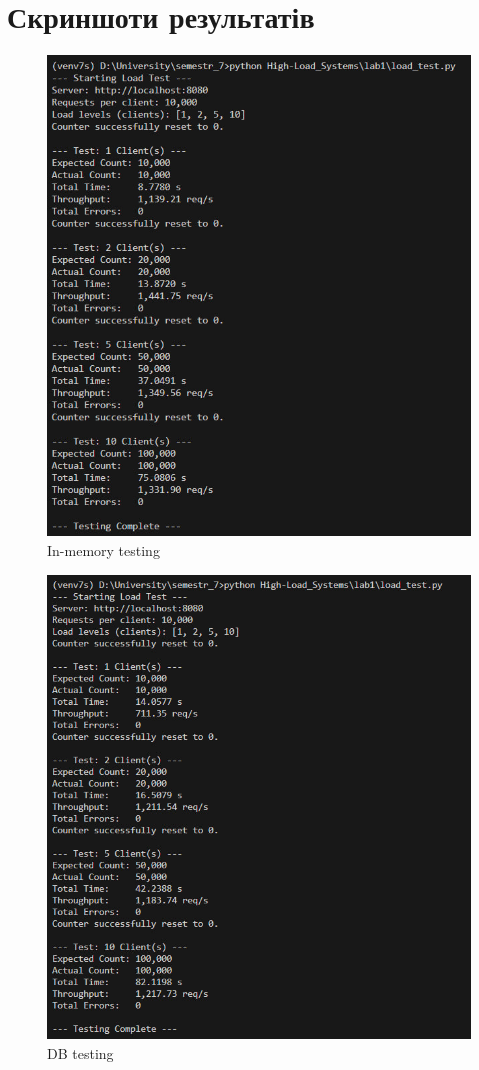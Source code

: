 \documentclass[12pt,a4paper]{article}
\begin{document}
\section{Скриншоти результатів}
\begin{figure}[h!]
  \centering
  \includegraphics[scale=0.5]{../imgs/in_memory.jpg}
  \caption{In-memory testing}
  \label{fig:in_memory}
\end{figure}
\begin{figure}[h!]
  \centering
  \includegraphics[scale=0.5]{../imgs/db.jpg}
  \caption{DB testing}
  \label{fig:db}
\end{figure}
\end{document}
